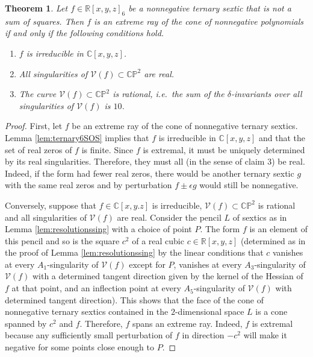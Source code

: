 \documentclass[a4paper]{article}
\numberwithin{equation}{section}
\newcommand{\R}{\mathbb{R}}
\newcommand{\C}{\mathbb{C}}
\renewcommand{\P}{\mathbb{P}}
\newcommand{\V}{\mathcal{V}}
\newtheorem{theorem}{Theorem}[section]
\theoremstyle{definition}
\theoremstyle{remark}
\begin{document}
\begin{theorem}\label{thm:exteme_ternary_sextic_conditions}
Let $f\in\R[x,y,z]_6$ be a nonnegative ternary sextic that is not a sum of squares. Then $f$ is an extreme ray of the cone of nonnegative polynomials if and only if the following conditions hold.
\begin{enumerate}
    \item $f$ is irreducible in $\C[x,y,z]$.
    \item All singularities of $\V(f)\subset \C\P^2$ are real.
    \item The curve $\V(f)\subset \C\P^2$ is rational, i.e.~the sum of the $\delta$-invariants over all singularities of $\V(f)$ is $10$.
\end{enumerate}
\end{theorem}

\begin{proof}
First, let $f$ be an extreme ray of the cone of nonnegative ternary sextics. Lemma \ref{lem:ternary6SOS} implies that $f$ is irreducible in $\C[x,y,z]$ and that the set of real zeros of $f$ is finite. Since $f$ is extremal, it must be uniquely determined by its real singularities. Therefore, they must all (in the sense of claim 3) be real. Indeed, if the form had fewer real zeros, there would be another ternary sextic $g$ with the same real zeros and by perturbation $f \pm \epsilon g$ would still be nonnegative. 

Conversely, suppose that $f\in\C[x,y.z]$ is irreducible, $\V(f)\subset \C\P^2$ is rational and all singularities of $\V(f)$ are real. Consider the pencil $L$ of sextics as in Lemma \ref{lem:resolutionssing} with a choice of point $P$. The form $f$ is an element of this pencil and so is the square $c^2$ of a real cubic $c\in\R[x,y,z]$ (determined as in the proof of Lemma \ref{lem:resolutionssing} by the linear conditions that $c$ vanishes at every $A_1$-singularity of $\V(f)$ except for $P$, vanishes at every $A_3$-singularity of $\V(f)$ with a determined tangent direction given by the kernel of the Hessian of $f$ at that point, and an inflection point at every $A_5$-singularity of $\V(f)$ with determined tangent direction). This shows that the face of the cone of nonnegative ternary sextics contained in the $2$-dimensional space $L$ is a cone spanned by $c^2$ and $f$. Therefore, $f$ spans an extreme ray. Indeed, $f$ is extremal because any sufficiently small perturbation of $f$ in direction $-c^2$ will make it negative for some points close enough to $P$.
\end{proof}
\end{document}

